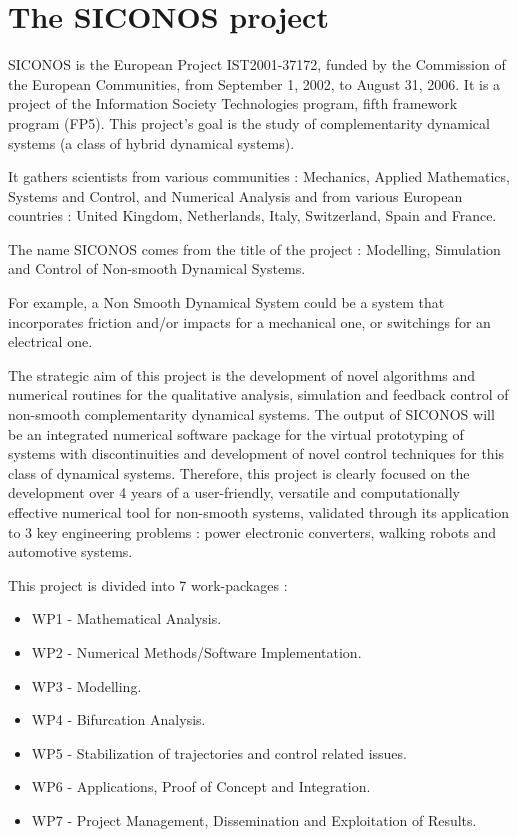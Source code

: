 \section{The \ac{SICONOS} project}
\ac{SICONOS} is the European Project  IST2001-37172, funded by the Commission of the European Communities, from September 1, 2002, to August 31, 2006.
It is a project of the Information Society Technologies program, fifth framework program (FP5). This project's goal is the study of complementarity dynamical systems (a class of hybrid dynamical systems).


It gathers scientists from various communities : Mechanics, Applied Mathematics, Systems and Control, and Numerical Analysis and from various European countries : United Kingdom, Netherlands, Italy, Switzerland, Spain and France. 

The name \ac{SICONOS} comes from the title of the project : Modelling, Simulation and Control of Non-smooth Dynamical Systems. 

For example, a Non Smooth Dynamical System could be a system that incorporates friction and/or impacts for a mechanical one, or switchings for an electrical one. 

The strategic aim of this project is the development of novel algorithms and numerical routines for the qualitative analysis, simulation and feedback control of non-smooth complementarity dynamical systems. The output of \ac{SICONOS} will be an integrated numerical software package for the virtual prototyping of systems with discontinuities and development of novel control techniques for this class of dynamical systems. Therefore, this project is clearly focused on the development over 4 years of a user-friendly, versatile and computationally effective numerical tool for non-smooth systems, validated through its application to 3 key engineering problems : power electronic converters, walking robots and automotive systems. 

This project is divided into 7 work-packages :
\begin{itemize}
\item WP1 - Mathematical Analysis.
\item WP2 - Numerical Methods/Software Implementation. 
\item WP3 - Modelling.
\item WP4 - Bifurcation Analysis.
\item WP5 - Stabilization of trajectories and control related issues.
\item WP6 - Applications, Proof of Concept and Integration.
\item WP7 - Project Management, Dissemination and Exploitation of Results.
\end{itemize}

